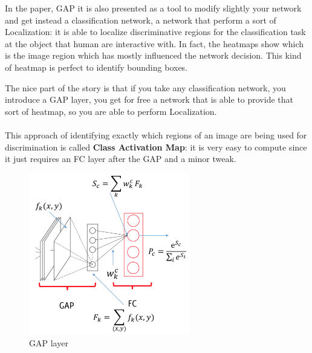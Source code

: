 In the paper, GAP it is also presented as a tool to modify slightly your network and get instead a classification network, a network that perform a sort of Localization: it is able to localize discriminative regions for the classification task at the object that human are interactive with. In fact, the heatmaps show which is the image region which has mostly influenced the network decision. This kind of heatmap is perfect to identify bounding boxes. 

The nice part of the story is that if you take any classification network, you introduce a GAP layer, you get for free a network that is able to provide that sort of heatmap, so you are able to perform Localization. \\ \\
This approach of identifying exactly which regions of an image are being used for discrimination is called \textbf{Class Activation Map}: it is very easy to compute since it just requires an FC layer after the GAP and a minor tweak. \\

 \begin{figure}
\includegraphics[width=7cm]{images/GAP_layer.png}
\caption{GAP layer}\label{wrap-fig:gap_layer}
\end{figure} 

